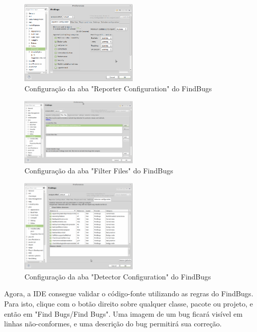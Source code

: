 \documentclass[12pt,journal,compsoc]{IEEEtran}
\begin{document}
\begin{figure}[ht!]
\centering
\includegraphics[width=0.5\textwidth]{img/eclipse-findbugs-07}
\caption{Configuração da aba "Reporter Configuration" do FindBugs}
\label{eclipse-findbugs-07}
\end{figure} 

\begin{figure}[ht!]
\centering
\includegraphics[width=0.5\textwidth]{img/eclipse-findbugs-08}
\caption{Configuração da aba "Filter Files" do FindBugs}
\label{eclipse-findbugs-08}
\end{figure} 

\begin{figure}[ht!]
\centering
\includegraphics[width=0.5\textwidth]{img/eclipse-findbugs-08b}
\caption{Configuração da aba "Detector Configuration" do FindBugs}
\label{eclipse-findbugs-08b}
\end{figure} 

Agora, a IDE consegue validar o código-fonte utilizando as regras do FindBugs. Para isto, clique com o botão direito sobre qualquer classe, pacote ou projeto, e então em "Find Bugs/Find Bugs". Uma imagem de um bug ficará visível em linhas não-conformes, e uma descrição do bug permitirá sua correção. 
\end{document}
